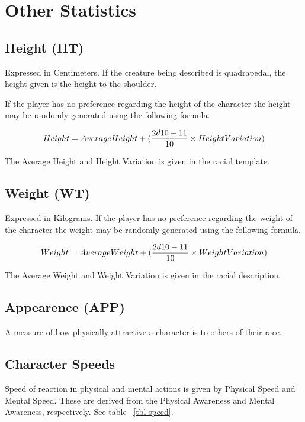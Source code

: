 


\section{Other Statistics}

\subsection{Height (HT)} Expressed in Centimeters. If the creature
being described is quadrapedal, the height given is the height
to the shoulder.

If the player has no preference regarding the height of the character
the height may be randomly generated using the following formula.

\[ Height = {Average Height} + ( {{2d10 - 11} \over {10}} \times
{Height Variation} )
\]

The Average Height and Height Variation is given in the racial
template.

\subsection{Weight (WT)} Expressed in Kilograms. If the player has no 
preference regarding the weight of the character the weight may be 
randomly generated using the following formula. 

\[ Weight = {Average Weight} + ( {{2d10 - 11} \over {10}} \times
{Weight Variation})
\]

The Average Weight and Weight Variation is given in the racial
description.

\subsection{Appearence        (APP)}
A measure of how physically attractive a character is
to others of their race.

\subsection{Character Speeds}

Speed of reaction in physical and mental actions is given by 
Physical Speed and Mental Speed. These are derived from the
Physical Awareness and Mental Awareness, respectively. See table 
~\ref{tbl-speed}.



